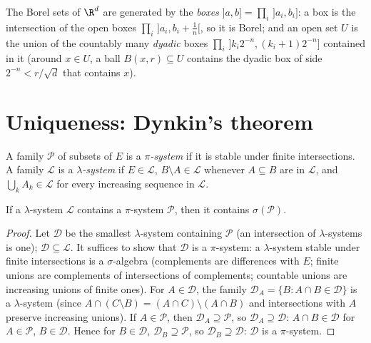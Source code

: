 The Borel sets of $\R^d$ are generated by the \emph{boxes} $]a,b]=\prod_i\,]a_i,b_i]$: a box is the intersection of the open boxes $\prod_i\,]a_i,b_i+\frac1n[$, so it is Borel; and an open
set $U$ is the union of the countably many \emph{dyadic} boxes $\prod_i\,]k_i2^{-n},(k_i+1)2^{-n}]$ contained in it (around $x\in U$, a ball $B(x,r)\subseteq U$ contains the dyadic box of
side $2^{-n}<r/\sqrt d$ that contains $x$).

\section{Uniqueness: Dynkin's theorem}

\begin{definition}
A family $\mathcal P$ of subsets of $E$ is a \emph{$\pi$-system} if it is stable under finite intersections. A family $\mathcal L$ is a \emph{$\lambda$-system} if $E\in\mathcal L$, $B\setminus A\in\mathcal L$ whenever
$A\subseteq B$ are in $\mathcal L$, and $\bigcup_kA_k\in\mathcal L$ for every increasing sequence in $\mathcal L$.
\end{definition}

\begin{theorem}\label{thm:dynkin6}
If a $\lambda$-system $\mathcal L$ contains a $\pi$-system $\mathcal P$, then it contains $\sigma(\mathcal P)$.
\end{theorem}
\begin{proof}
Let $\mathcal D$ be the smallest $\lambda$-system containing $\mathcal P$ (an intersection of $\lambda$-systems is one); $\mathcal D\subseteq\mathcal L$. It suffices to show that $\mathcal D$ is a $\pi$-system:
a $\lambda$-system stable under finite intersections is a $\sigma$-algebra (complements are differences with $E$; finite unions are complements of
intersections of complements; countable unions are increasing unions of finite ones). For $A\in\mathcal D$, the family $\mathcal D_A=\{B:A\cap B\in\mathcal D\}$ is a
$\lambda$-system (since $A\cap(C\setminus B)=(A\cap C)\setminus(A\cap B)$ and intersections with $A$ preserve increasing unions). If $A\in\mathcal P$, then $\mathcal D_A\supseteq\mathcal P$, so $\mathcal D_A\supseteq\mathcal D$:
$A\cap B\in\mathcal D$ for $A\in\mathcal P$, $B\in\mathcal D$. Hence for $B\in\mathcal D$, $\mathcal D_B\supseteq\mathcal P$, so $\mathcal D_B\supseteq\mathcal D$: $\mathcal D$ is a $\pi$-system.
\end{proof}

